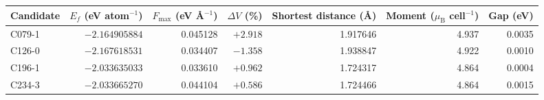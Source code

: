 \begin{tabular}{@{}lrrrrrr@{}}
\toprule
Candidate & $E_f$ (eV atom$^{-1}$) & $F_{\max}$ (eV \AA$^{-1}$) &
$\Delta V$ (\%) & Shortest distance (\AA) &
Moment ($\mu_{\mathrm{B}}$ cell$^{-1}$) & Gap (eV) \\
\midrule
C079-1 & $-2.164905884$ & 0.045128 & $+2.918$ & 1.917646 & 4.937 & 0.0035 \\
C126-0 & $-2.167618531$ & 0.034407 & $-1.358$ & 1.938847 & 4.922 & 0.0010 \\
C196-1 & $-2.033635033$ & 0.033610 & $+0.962$ & 1.724317 & 4.864 & 0.0004 \\
C234-3 & $-2.033665270$ & 0.044104 & $+0.586$ & 1.724466 & 4.864 & 0.0015 \\
\bottomrule
\end{tabular}
